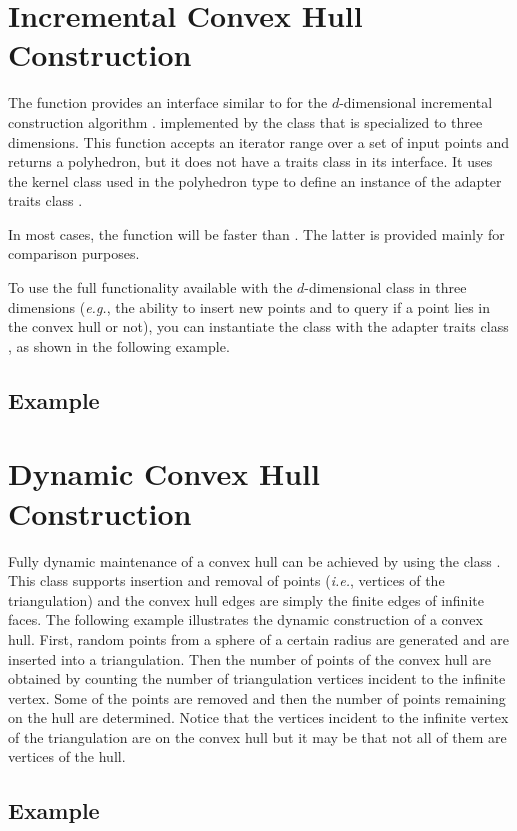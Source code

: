 

\section{Incremental  Convex Hull Construction}

The function  %
 provides an
interface similar to  for the $d$-dimensional 
incremental construction algorithm \cite{cms-frric-93}.  
implemented by the class  that is specialized 
to three dimensions. This function accepts an iterator range over a set of
input points and returns a polyhedron, but it does not have a traits class
in its interface.  It uses the kernel
class  used in the polyhedron type to define an instance of the 
adapter traits class .

In most cases, the function  will be faster than
.  The latter is provided mainly 
for comparison purposes. 

To use the full functionality available with the $d$-dimensional class 
 in three dimensions (\textit{e.g.}, the ability
to insert new points and to query if a point lies in the convex hull or not), 
you can instantiate the class  with the adapter
traits class , as shown in the following
example.

\subsection{Example}


\section{Dynamic  Convex Hull Construction}

Fully dynamic maintenance of a convex hull can be achieved by using the
class .  This class supports insertion
and removal of points (\textit{i.e.}, vertices of the triangulation) and the 
convex hull edges are simply the finite edges of infinite faces.  
The following example illustrates the dynamic construction of a convex hull.
First, random points from a sphere of a certain radius are generated and are
inserted into a triangulation.  Then the number of points of the convex hull 
are obtained by counting the number of triangulation vertices incident to the 
infinite vertex.  Some of the points are removed and then the number of points 
remaining on the hull are determined.  Notice that the vertices incident to the
infinite vertex of the triangulation are on the convex hull but it may be that
not all of them are vertices of the hull.

\subsection{Example}



